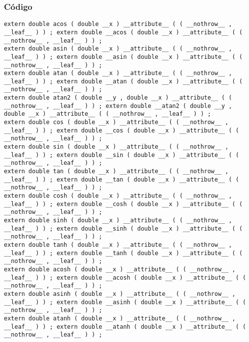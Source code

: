 \documentclass{beamer}
\begin{document}
\begin{frame}[fragile]
\frametitle{C\'odigo}
\begin{verbatim}
extern double acos ( double __x ) __attribute__ ( ( __nothrow__ , __leaf__ ) ) ; extern double __acos ( double __x ) __attribute__ ( ( __nothrow__ , __leaf__ ) ) ; 
extern double asin ( double __x ) __attribute__ ( ( __nothrow__ , __leaf__ ) ) ; extern double __asin ( double __x ) __attribute__ ( ( __nothrow__ , __leaf__ ) ) ; 
extern double atan ( double __x ) __attribute__ ( ( __nothrow__ , __leaf__ ) ) ; extern double __atan ( double __x ) __attribute__ ( ( __nothrow__ , __leaf__ ) ) ; 
extern double atan2 ( double __y , double __x ) __attribute__ ( ( __nothrow__ , __leaf__ ) ) ; extern double __atan2 ( double __y , double __x ) __attribute__ ( ( __nothrow__ , __leaf__ ) ) ; 
extern double cos ( double __x ) __attribute__ ( ( __nothrow__ , __leaf__ ) ) ; extern double __cos ( double __x ) __attribute__ ( ( __nothrow__ , __leaf__ ) ) ; 
extern double sin ( double __x ) __attribute__ ( ( __nothrow__ , __leaf__ ) ) ; extern double __sin ( double __x ) __attribute__ ( ( __nothrow__ , __leaf__ ) ) ; 
extern double tan ( double __x ) __attribute__ ( ( __nothrow__ , __leaf__ ) ) ; extern double __tan ( double __x ) __attribute__ ( ( __nothrow__ , __leaf__ ) ) ; 
extern double cosh ( double __x ) __attribute__ ( ( __nothrow__ , __leaf__ ) ) ; extern double __cosh ( double __x ) __attribute__ ( ( __nothrow__ , __leaf__ ) ) ; 
extern double sinh ( double __x ) __attribute__ ( ( __nothrow__ , __leaf__ ) ) ; extern double __sinh ( double __x ) __attribute__ ( ( __nothrow__ , __leaf__ ) ) ; 
extern double tanh ( double __x ) __attribute__ ( ( __nothrow__ , __leaf__ ) ) ; extern double __tanh ( double __x ) __attribute__ ( ( __nothrow__ , __leaf__ ) ) ; 
extern double acosh ( double __x ) __attribute__ ( ( __nothrow__ , __leaf__ ) ) ; extern double __acosh ( double __x ) __attribute__ ( ( __nothrow__ , __leaf__ ) ) ; 
extern double asinh ( double __x ) __attribute__ ( ( __nothrow__ , __leaf__ ) ) ; extern double __asinh ( double __x ) __attribute__ ( ( __nothrow__ , __leaf__ ) ) ; 
extern double atanh ( double __x ) __attribute__ ( ( __nothrow__ , __leaf__ ) ) ; extern double __atanh ( double __x ) __attribute__ ( ( __nothrow__ , __leaf__ ) ) ; 
\end{verbatim}
\end{frame}
\end{document}
